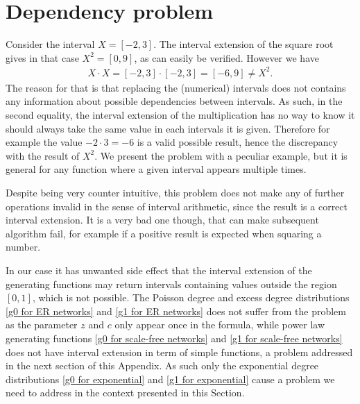\documentclass[
11pt, %
english, %
singlespacing, %
nolistspacing, %
liststotoc, %
headsepline, %
]{MastersDoctoralThesis} %
\begin{document}
\section{Dependency problem}

Consider the interval $X = [-2, 3]$. The interval extension of the square root gives in that case $X^2 = [0, 9]$, as can easily be verified. However we have
\begin{align}
	X \cdot X = [-2, 3] \cdot [-2, 3] = [-6, 9] \neq X^2.
\end{align}
The reason for that is that replacing the (numerical) intervals does not contains any information about possible dependencies between intervals. As such, in the second equality, the interval extension of the multiplication has no way to know it should always take the same value in each intervals it is given. Therefore for example the value $-2 \cdot 3 = -6$ is a valid possible result, hence the discrepancy with the result of $X^2$. We present the problem with a peculiar example, but it is general for any function where a given interval appears multiple times.

Despite being very counter intuitive, this problem does not make any of further operations invalid in the sense of interval arithmetic, since the result is a correct interval extension. It is a very bad one though, that can make subsequent algorithm fail, for example if a positive result is expected when squaring a number.

In our case it has unwanted side effect that the interval extension of the generating functions may return intervals containing values outside the region $[0, 1]$, which is not possible. The Poisson degree and excess degree distributions \eqref{g0 for ER networks} and \eqref{g1 for ER networks} does not suffer from the problem as the parameter $z$ and $c$ only appear once in the formula, while power law generating functions \eqref{g0 for scale-free networks} and \eqref{g1 for scale-free networks} does not have interval extension in term of simple functions, a problem addressed in the next section of this Appendix. As such only the exponential degree distributions \eqref{g0 for exponential} and \eqref{g1 for exponential} cause a problem we need to address in the context presented in this Section.
\end{document}
